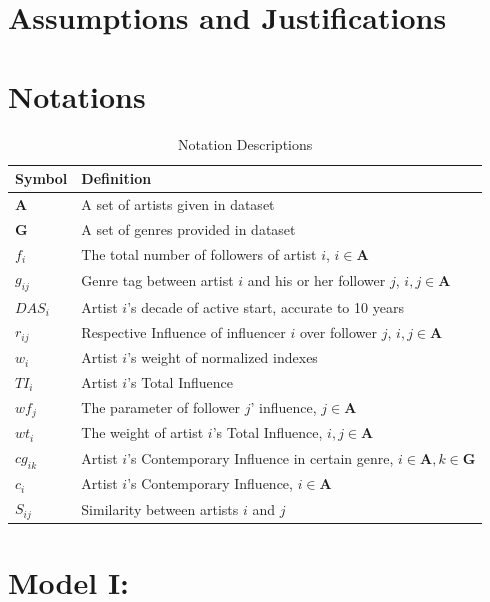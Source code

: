 \documentclass{mcmthesis}
\numberwithin{figure}{section}
\numberwithin{table}{section}
\numberwithin{equation}{section}
\begin{document}
\section{Assumptions and Justifications}



\section{Notations}

\renewcommand\arraystretch{1.5}

\begin{table}[htpb!]
  \centering
  \caption{Notation Descriptions} \label{Varibles}
  \begin{tabular}{m{2.5cm}<{\centering}|m{12.5cm}<{\centering}}
  \toprule[1.5pt]
  \textbf{Symbol} & \textbf{Definition} \\ \hline
  $\mathbf{A}$ & A set of artists given in dataset \\
  $\mathbf{G}$ & A set of genres provided in dataset \\
  $f_i$ & The total number of followers of artist $i$, $i\in \mathbf{A}$ \\
  $g_{ij}$ & Genre tag between artist $i$ and his or her follower $j$, $i,j \in \mathbf{A}$ \\
  $DAS_{i}$ & Artist $i$'s decade of active start, accurate to 10 years \\
  $r_{ij}$ & Respective Influence of influencer $i$ over follower $j$, $i,j \in \mathbf{A}$ \\
  $w_{i}$ & Artist $i$'s weight of normalized indexes \\ 
  $TI_{i} $ & Artist $i$'s Total Influence \\
  $wf_j$ & The parameter of follower $j$' influence, $j\in \mathbf{A}$ \\
  $wt_{i}$ & The weight of artist $i$'s Total Influence, $i,j\in \mathbf{A}$\\
  $cg_{ik}$ & Artist $i$'s Contemporary Influence in certain genre, $i\in \mathbf{A}, k \in \mathbf{G}$ \\
  $c_{i}$ & Artist $i$'s Contemporary Influence, $i\in \mathbf{A}$ \\
  $S_{ij} $ & Similarity between artists $i$ and $j$ \\
  \bottomrule[1.5pt]
  \end{tabular}
  \end{table}




\section{Model I:}
\end{document}
